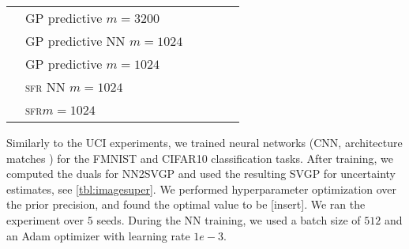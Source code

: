 \documentclass{article}
\newlength{\tblw}
\newcommand{\our}{\textsc{sfr}\xspace}
\begin{document}
\begin{table}[t!]
\begin{tabular}{l l C{\tblw} C{\tblw} C{\tblw} C{\tblw}}
    & GP predictive \cite{immer2021improving} $m=3200$ &  &  &  \\
    & GP predictive NN $m=1024$ &   &  &  \\
    & GP predictive $m=1024$  &   &  &  \\
    & \our NN $m=1024$ &   &  &  \\
    & \our $m=1024$ &   &  &  \\
    \bottomrule
  \end{tabular}



\end{table}

Similarly to the UCI experiments, we trained neural networks (CNN, architecture matches \citet{immer2021improving}) for the FMNIST and CIFAR10 classification tasks. After training, we computed the duals for NN2SVGP and used the resulting SVGP for uncertainty estimates, see \cref{tbl:imagesuper}. We performed hyperparameter optimization over the prior precision, and found the optimal value to be [insert]. We ran the experiment over $5$ seeds. During the NN training, we used a batch size of $512$ and an Adam optimizer with learning rate $1e-3$.
\end{document}
